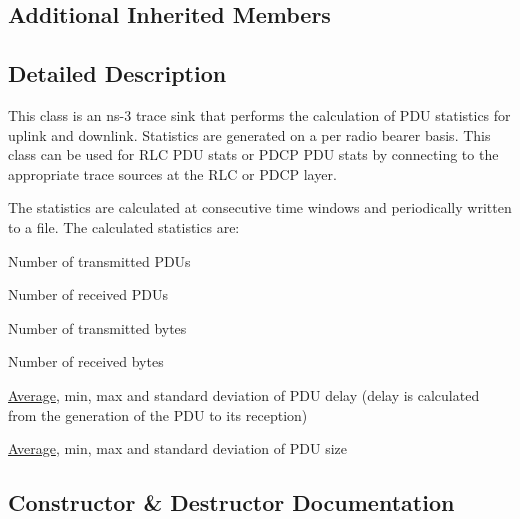 \subsection*{Additional Inherited Members}


\subsection{Detailed Description}
This class is an ns-\/3 trace sink that performs the calculation of P\+DU statistics for uplink and downlink. Statistics are generated on a per radio bearer basis. This class can be used for R\+LC P\+DU stats or P\+D\+CP P\+DU stats by connecting to the appropriate trace sources at the R\+LC or P\+D\+CP layer.

The statistics are calculated at consecutive time windows and periodically written to a file. The calculated statistics are\+:


\begin{DoxyItemize}
\item Number of transmitted P\+D\+Us
\item Number of received P\+D\+Us
\item Number of transmitted bytes
\item Number of received bytes
\item \hyperlink{classns3_1_1Average}{Average}, min, max and standard deviation of P\+DU delay (delay is calculated from the generation of the P\+DU to its reception)
\item \hyperlink{classns3_1_1Average}{Average}, min, max and standard deviation of P\+DU size 
\end{DoxyItemize}

\subsection{Constructor \& Destructor Documentation}
